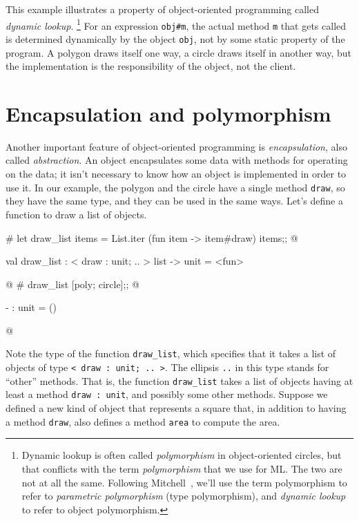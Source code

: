 %
%
This example illustrates a property of object-oriented programming called \emph{dynamic lookup}.
%
\footnote{Dynamic lookup is often called \emph{polymorphism} in object-oriented circles, but that
  conflicts with the term \emph{polymorphism} that we use for ML.  The two are not at all the same.
  Following Mitchell~\cite{Mit03}, we'll use the term polymorphism to refer to \emph{parametric
    polymorphism} (type polymorphism), and \emph{dynamic lookup} to refer to object polymorphism.}
%
For an expression \hbox{\lstinline/obj#m/}, the actual method \hbox{\lstinline/m/} that gets called is determined
dynamically by the object \hbox{\lstinline/obj/}, not by some static property of the program.  A polygon
draws itself one way, a circle draws itself in another way, but the implementation is the
responsibility of the object, not the client.

\section{Encapsulation and polymorphism}
\label{section:object-constraint}

Another important feature of object-oriented programming is \emph{encapsulation}, also
called \emph{abstraction}.  An object encapsulates some data with methods for operating on the data;
it isn't necessary to know how an object is implemented in order to use it.  In our example, the
polygon and the circle have a single method \hbox{\lstinline/draw/}, so they have the same type, and they
can be used in the same ways.  Let's define a function to draw a list of objects.

\begin{ocaml}
# let draw_list items =
     List.iter (fun item -> item#draw) items;;
@
\begin{topoutput}
val draw_list : < draw : unit; .. > list -> unit = <fun>
\end{topoutput}
@
# draw_list [poly; circle];;
@
\begin{topoutput}
- : unit = ()
\end{topoutput}
@
\end{ocaml}
%
\label{keyword:..}
Note the type of the function \hbox{\lstinline/draw_list/}, which specifies that it takes a list of objects
of type \hbox{\lstinline/< draw : unit; .. >/}.  The ellipsis \hbox{\lstinline/../} in this type stands for ``other''
methods.  That is, the function \hbox{\lstinline/draw_list/} takes a list of objects having at least a
method \hbox{\lstinline/draw : unit/}, and possibly some other methods.  Suppose we defined a new kind of
object that represents a square that, in addition to having a method \hbox{\lstinline/draw/}, also defines
a method \hbox{\lstinline/area/} to compute the area.

